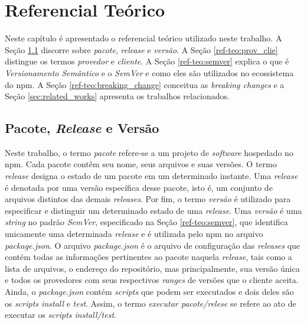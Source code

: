 \chapter{Referencial Teórico}
\label{cap:ref-teorico}
Neste capítulo é apresentado o referencial teórico utilizado neste trabalho. A Seção \ref{ref-teo:pac_rel_ver} discorre sobre \textit{pacote}, \textit{release} e \textit{versão}. A Seção \ref{ref-teo:prov_clie} distingue os termos \textit{provedor} e \textit{cliente}. A Seção \ref{ref-teo:semver} explica o que é \textit{Versionamento Semântico} e o \textit{SemVer} e como eles são utilizados no ecossistema do \gls{npm}. A Seção \ref{ref-teo:breaking_change} conceitua as \textit{breaking changes} e a Seção \ref{sec:related_works} apresenta os trabalhos relacionados.

\section{Pacote, \textit{Release} e Versão}
\label{ref-teo:pac_rel_ver}
Neste trabalho, o termo \textit{pacote} refere-se a um projeto de \textit{software} hospedado no \gls{npm}. Cada pacote contêm seu nome, seus arquivos e suas versões. O termo \textit{release} designa o estado de um pacote em um determinado instante. Uma \textit{release} é denotada por uma versão específica desse pacote, isto é, um conjunto de arquivos distintos das demais \textit{releases}. Por fim, o termo \textit{versão} é utilizado para especificar e distinguir um determinado estado de uma \textit{release}. Uma \textit{versão} é uma \textit{string} no padrão \textit{SemVer}, especificado na Seção \ref{ref-teo:semver}, que identifica unicamente uma determinada \textit{release} e é utilizada pelo \gls{npm} no arquivo \textit{package.json}. O arquivo \textit{package.json} é o arquivo de configuração das \textit{releases} que contém todas as informações pertinentes ao pacote naquela \textit{release}, tais como a lista de arquivos, o endereço do repositório, mas principalmente, sua versão única e todos os provedores com seus respectivos \textit{ranges} de versões que o cliente aceita. Ainda, o \textit{package.json} contém \textit{scripts} que podem ser executados e dois deles são os \textit{scripts install} e \textit{test}. Assim, o termo \textit{executar pacote/relese} se refere ao ato de executar os \textit{scripts install/test}.


